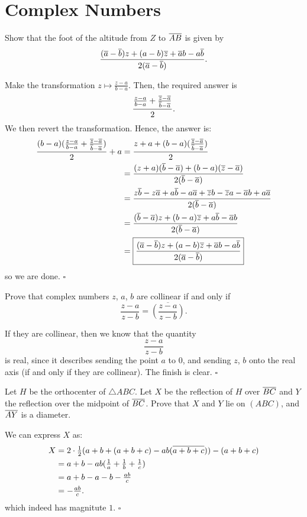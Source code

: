\documentclass{article}
\begin{document}
\newpage

\section{Complex Numbers}
\begin{problem}[6.3]{}
Show that the foot of the altitude from $Z$ to $\overline{AB}$ is given by \[\dfrac{(\overline{a}-\overline{b})z+(a-b)\overline{z}+\overline{a}b-a\overline{b}}{2(\overline{a}-\overline{b})}.\]
\end{problem}

Make the transformation $z \mapsto \tfrac{z-a}{b-a}$. Then, the required answer is \[\dfrac{\tfrac{z-a}{b-a} + \tfrac{\overline{z}-\overline{a}}{\overline{b}-\overline{a}}}{2}.\] We then revert the transformation. Hence, the answer is:
\begin{align*}
\dfrac{(b-a)(\tfrac{z-a}{b-a} + \tfrac{\overline{z}-\overline{a}}{\overline{b}-\overline{a}})}{2}+a &= \dfrac{z+a+(b-a)(\tfrac{\overline{z}-\overline{a}}{\overline{b}-\overline{a}})}{2} \\
&= \dfrac{(z+a)(\overline{b}-\overline{a})+(b-a)(\overline{z}-\overline{a})}{2(\overline{b}-\overline{a})} \\
&= \dfrac{z\overline{b}-z\overline{a}+a\overline{b}-a\overline{a}+\overline{z}b-\overline{z}a-\overline{a}b+a\overline{a}}{2(\overline{b}-\overline{a})} \\
&= \dfrac{(\overline{b}-\overline{a})z+(b-a)\overline{z}+a\overline{b}-\overline{a}b}{2(\overline{b}-\overline{a})} \\
&= \boxed{\dfrac{(\overline{a}-\overline{b})z+(a-b)\overline{z}+\overline{a}b-a\overline{b}}{2(\overline{a}-\overline{b})}} \\
\end{align*}
so we are done. $\square$

\begin{problem}[6.8]{}
Prove that complex numbers $z$, $a$, $b$ are collinear if and only if \[\dfrac{z - a}{z - b} =\overline{\left(\dfrac{z - a}{z - b}\right)}.\]
\end{problem}

If they are collinear, then we know that the quantity \[\dfrac{z-a}{z-b}\] is real, since it describes sending the point $a$ to $0$, and sending $z$, $b$ onto the real axis (if and only if they are collinear). The finish is clear. $\square$

\begin{problem}[6.14]{}
Let $H$ be the orthocenter of $\triangle ABC$. Let $X$ be the reflection of $H$ over $\overline{BC}$ and $Y$ the reflection over the midpoint of $\overline{BC}$. Prove that $X$ and $Y$ lie on $(ABC)$, and $\overline{AY}$ is a diameter.
\end{problem}

We can express $X$ as: 
\begin{align*}
X &= 2\cdot \tfrac{1}{2}(a+b+(a+b+c)-ab(\overline{a+b+c}))-(a+b+c) \\
&= a+b-ab(\tfrac{1}{a}+\tfrac{1}{b}+\tfrac{1}{c}) \\
&= a+b-a-b-\tfrac{ab}{c} \\
&= -\tfrac{ab}{c}.
\end{align*}
which indeed has magnitute $1$. $\square$
\end{document}
